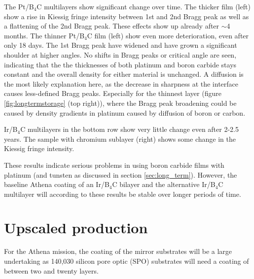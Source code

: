 The Pt/B$_4$C multilayers show significant change over time. The thicker film (left) show a rise in Kiessig fringe intensity between 1st and 2nd Bragg peak as well as a flattening of the 2nd Bragg peak. These effects show up already after $\sim$4 months. The thinner Pt/B$_4$C film (left) show even more deterioration, even after only 18 days. The 1st Bragg peak have widened and have grown a significant shoulder at higher angles. No shifts in Bragg peaks or critical angle are seen, indicating that the the thicknesses of both platinum and boron carbide stays constant and the overall density for either material is unchanged. A diffusion is the most likely explanation here, as the decrease in sharpness at the interface causes less-defined Bragg peaks. Especially for the thinnest layer (figure \ref{fig:longtermstorage} (top right)), where the Bragg peak broadening could be caused by density gradients in platinum caused by diffusion of boron or carbon.

Ir/B$_4$C multilayers in the bottom row show very little change even after 2-2.5 years. The sample with chromium sublayer (right) shows some change in the Kiessig fringe intensity.

These results indicate serious problems in using boron carbide films with platinum (and tunsten as discussed in section \ref{sec:long_term}). However, the baseline Athena coating of an Ir/B$_4$C bilayer and the alternative Ir/B$_4$C multilayer will according to these results be stable over longer periods of time.

\section{Upscaled production}\label{sec:Athena_upscaled}


For the Athena mission, the coating of the mirror substrates will be a large undertaking as 140,030 silicon pore optic (SPO) substrates will need a coating of between two and twenty layers.

